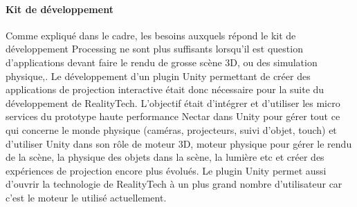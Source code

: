 \paragraph{Kit de développement} Comme expliqué dans le cadre, les besoins auxquels répond le kit de développement Processing ne sont plus suffisants lorsqu'il est question d'applications devant faire le rendu de grosse scène 3D, ou des simulation physique,. Le développement d'un plugin Unity permettant de créer des applications de projection interactive était donc nécessaire pour la suite du développement de RealityTech. L'objectif était d'intégrer et d'utiliser les micro services du prototype haute performance Nectar dans Unity pour gérer tout ce qui concerne le monde physique (caméras, projecteurs, suivi d'objet, touch) et d'utiliser Unity dans son rôle de moteur 3D, moteur physique pour gérer le rendu de la scène, la physique des objets dans la scène, la lumière etc et créer des expériences de projection encore plus évolués. Le plugin Unity permet aussi d'ouvrir la technologie de RealityTech à un plus grand nombre d'utilisateur car c'est le moteur le utilisé actuellement.